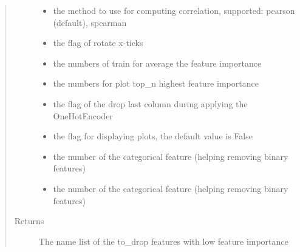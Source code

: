 \documentclass[letterpaper,11pt,english]{sphinxmanual}
\begin{document}
\begin{fulllineitems}
\begin{fulllineitems}
\begin{quote}
\begin{description}
\begin{itemize}
\item {} 
 \textendash{} the method to use for computing correlation, supported: pearson (default), spearman

\item {} 
 \textendash{} the flag of rotate x-ticks

\item {} 
 \textendash{} the numbers of train for average the feature importance

\item {} 
 \textendash{} the numbers for plot top\_n highest feature importance

\item {} 
 \textendash{} the flag of the drop last column during applying the OneHotEncoder

\item {} 
 \textendash{} the flag for displaying plots, the default value is False

\item {} 
 \textendash{} the number of the categorical feature (helping removing binary features)

\item {} 
 \textendash{} the number of the categorical feature (helping removing binary features)

\end{itemize}

\item[{Returns}] \leavevmode
The name list of the to\_drop features with low feature importance

\end{description}\end{quote}

\end{fulllineitems}



\end{fulllineitems}
\end{document}
